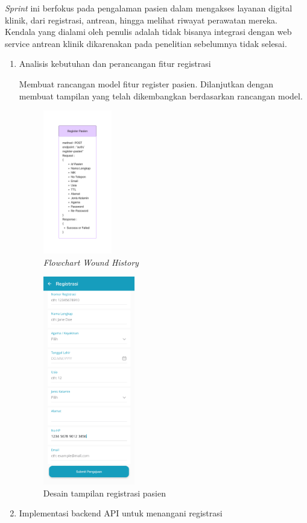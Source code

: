 \textit{Sprint} ini berfokus pada pengalaman pasien dalam mengakses layanan digital klinik, dari registrasi, antrean, hingga melihat riwayat perawatan mereka. Kendala yang dialami oleh penulis adalah tidak bisanya integrasi dengan web service antrean klinik dikarenakan pada penelitian sebelumnya tidak selesai.
\begin{enumerate}
\item Analisis kebutuhan dan perancangan fitur registrasi

Membuat rancangan model fitur register pasien. Dilanjutkan dengan membuat tampilan yang telah dikembangkan berdasarkan rancangan model.
	\begin{figure}[H]
		\centering
		\includegraphics[keepaspectratio, width=3cm]{gambar/rancangan_fitur_registrasi}
		\caption{\textit{Flowchart Wound History}}
		\label{gambar:rancangan_fitur_registrasi}
	\end{figure}
	\begin{figure}[H]
		\centering
		\includegraphics[keepaspectratio, width=4cm]{gambar/tampilan_registrasi}
		\caption{Desain tampilan registrasi pasien}
		\label{gambar:tampilan_registrasi}
	\end{figure}
\item Implementasi backend API untuk menangani registrasi


\end{enumerate}
